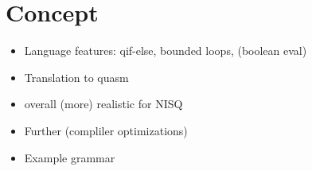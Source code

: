 \chapter{Concept}
\begin{itemize}
    \item Language features: qif-else, bounded loops, (boolean eval)
    \item Translation to quasm
    \item overall (more) realistic for NISQ 
    \item Further (compliler optimizations)
    \item Example grammar
\end{itemize}

